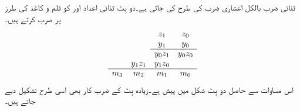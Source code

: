 ثنائی ضرب بالکل اعشاری ضرب کی طرح کی جاتی ہے۔دو بِٹ ثنائی اعداد  اور  کو قلم و کاغذ کی طرز پر ضرب کرتے ہیں۔
\begin{align*}
\begin{array}{cccc}
&& z_1&z_0\\
&& y_1&y_0\\
\cline{3-4}
&& y_0z_1&y_0z_0\\
&y_1z_1&y_1z_0&\\
\cline{1-4}
m_3&m_2&m_1&m_0
\end{array}
\end{align*}
اس مساوات سے حاصل دو بِٹ شکل  میں پیش ہے۔زیادہ بِٹ کے ضرب کار بھی اسی طرح تشکیل دیے جاتے ہیں۔

